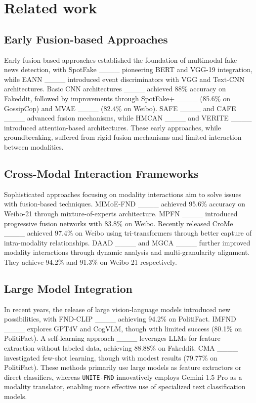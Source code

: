 \section{Related work}
\subsection{Early Fusion-based Approaches}
Early fusion-based approaches established the foundation of multimodal fake news detection, with SpotFake ____ pioneering BERT and VGG-19 integration, while EANN ____ introduced event discriminators with VGG and Text-CNN architectures. Basic CNN architectures ____ achieved 88\% accuracy on Fakeddit, followed by improvements through SpotFake+ ____ (85.6\% on GossipCop) and MVAE ____ (82.4\% on Weibo). SAFE ____ and CAFE ____ advanced fusion mechanisms, while HMCAN ____ and VERITE ____ introduced attention-based architectures. These early approaches, while groundbreaking, suffered from rigid fusion mechanisms and limited interaction between modalities.

\subsection{Cross-Modal Interaction Frameworks}
Sophisticated approaches focusing on modality interactions aim to solve issues with fusion-based techniques. MIMoE-FND ____ achieved 95.6\% accuracy on Weibo-21 through mixture-of-experts architecture. MPFN ____ introduced progressive fusion networks with 83.8\% on Weibo. Recently released CroMe ____ achieved 97.4\% on Weibo using tri-transformers through better capture of intra-modality relationships. DAAD ____ and MGCA ____ further improved modality interactions through dynamic analysis and multi-granularity alignment. They achieve 94.2\% and 91.3\% on Weibo-21 respectively.

\subsection{Large Model Integration}
In recent years, the release of large vision-language models introduced new possibilities,  with FND-CLIP ____ achieving 94.2\% on PolitiFact. IMFND ____ explores GPT4V and CogVLM, though with limited success (80.1\% on PolitiFact). A self-learning approach ____ leverages LLMs for feature extraction without labeled data, achieving 88.88\% on Fakeddit. CMA ____ investigated few-shot learning, though with modest results (79.77\% on PolitiFact). These methods primarily use large models as feature extractors or direct classifiers, whereas \texttt{UNITE-FND} innovatively employs Gemini 1.5 Pro as a modality translator, enabling more effective use of specialized text classification models.

